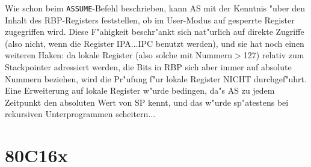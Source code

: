 \documentclass[12pt,a4paper,twoside]{report}
\newcommand{\tty}[1]{{\tt #1}}
\begin{document}
{Wie schon beim \tty{ASSUME}-Befehl beschrieben, kann AS mit der Kenntnis
"uber den Inhalt des RBP-Registers feststellen, ob im User-Modus
auf gesperrte Register zugegriffen wird.  Diese F"ahigkeit
beschr"ankt sich nat"urlich auf direkte Zugriffe (also nicht, wenn
die Register IPA...IPC benutzt werden), und sie hat noch einen
weiteren Haken: da lokale Register (also solche mit Nummern$>$127)
relativ zum Stackpointer adressiert werden, die Bits in RBP sich
aber immer auf absolute Nummern beziehen, wird die Pr"ufung f"ur
lokale Register NICHT durchgef"uhrt.  Eine Erweiterung auf lokale
Register w"urde bedingen, da"s AS zu jedem Zeitpunkt den absoluten
Wert von SP kennt, und das w"urde sp"atestens bei rekursiven
Unterprogrammen scheitern...


\section{80C16x}

}
\end{document}
